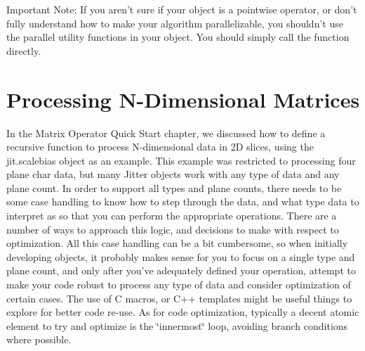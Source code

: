 Important Note: If you aren't sure if your object is a pointwise operator, or don't fully understand how to make your algorithm parallelizable, you shouldn't use the parallel utility functions in your object. You should simply call the function directly.\hypertarget{chapter_jit_mopdetails_chapter_jit_mopdetails_ndim}{}\section{Processing N-\/Dimensional Matrices}\label{chapter_jit_mopdetails_chapter_jit_mopdetails_ndim}
In the Matrix Operator Quick Start chapter, we discussed how to define a recursive function to process N-\/dimensional data in 2D slices, using the jit.scalebias object as an example. This example was restricted to processing four plane char data, but many Jitter objects work with any type of data and any plane count. In order to support all types and plane counts, there needs to be some case handling to know how to step through the data, and what type data to interpret as so that you can perform the appropriate operations. There are a number of ways to approach this logic, and decisions to make with respect to optimization. All this case handling can be a bit cumbersome, so when initially developing objects, it probably makes sense for you to focus on a single type and plane count, and only after you've adequately defined your operation, attempt to make your code robust to process any type of data and consider optimization of certain cases. The use of C macros, or C++ templates might be useful things to explore for better code re-\/use. As for code optimization, typically a decent atomic element to try and optimize is the \char`\"{}innermost\char`\"{} loop, avoiding branch conditions where possible.

